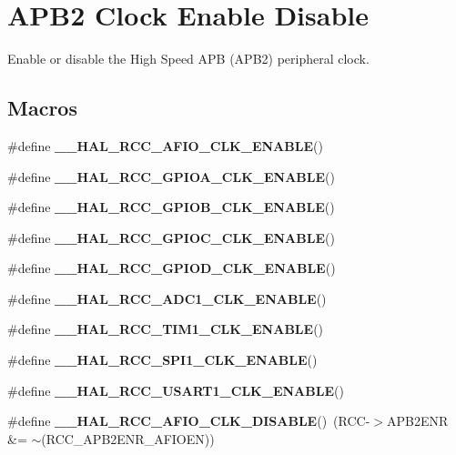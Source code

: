 \hypertarget{group___r_c_c___a_p_b2___clock___enable___disable}{}\section{A\+P\+B2 Clock Enable Disable}
\label{group___r_c_c___a_p_b2___clock___enable___disable}


Enable or disable the High Speed A\+PB (A\+P\+B2) peripheral clock.  


\subsection*{Macros}
\begin{DoxyCompactItemize}
\item 
\#define {\bfseries \+\_\+\+\_\+\+H\+A\+L\+\_\+\+R\+C\+C\+\_\+\+A\+F\+I\+O\+\_\+\+C\+L\+K\+\_\+\+E\+N\+A\+B\+LE}()
\item 
\#define {\bfseries \+\_\+\+\_\+\+H\+A\+L\+\_\+\+R\+C\+C\+\_\+\+G\+P\+I\+O\+A\+\_\+\+C\+L\+K\+\_\+\+E\+N\+A\+B\+LE}()
\item 
\#define {\bfseries \+\_\+\+\_\+\+H\+A\+L\+\_\+\+R\+C\+C\+\_\+\+G\+P\+I\+O\+B\+\_\+\+C\+L\+K\+\_\+\+E\+N\+A\+B\+LE}()
\item 
\#define {\bfseries \+\_\+\+\_\+\+H\+A\+L\+\_\+\+R\+C\+C\+\_\+\+G\+P\+I\+O\+C\+\_\+\+C\+L\+K\+\_\+\+E\+N\+A\+B\+LE}()
\item 
\#define {\bfseries \+\_\+\+\_\+\+H\+A\+L\+\_\+\+R\+C\+C\+\_\+\+G\+P\+I\+O\+D\+\_\+\+C\+L\+K\+\_\+\+E\+N\+A\+B\+LE}()
\item 
\#define {\bfseries \+\_\+\+\_\+\+H\+A\+L\+\_\+\+R\+C\+C\+\_\+\+A\+D\+C1\+\_\+\+C\+L\+K\+\_\+\+E\+N\+A\+B\+LE}()
\item 
\#define {\bfseries \+\_\+\+\_\+\+H\+A\+L\+\_\+\+R\+C\+C\+\_\+\+T\+I\+M1\+\_\+\+C\+L\+K\+\_\+\+E\+N\+A\+B\+LE}()
\item 
\#define {\bfseries \+\_\+\+\_\+\+H\+A\+L\+\_\+\+R\+C\+C\+\_\+\+S\+P\+I1\+\_\+\+C\+L\+K\+\_\+\+E\+N\+A\+B\+LE}()
\item 
\#define {\bfseries \+\_\+\+\_\+\+H\+A\+L\+\_\+\+R\+C\+C\+\_\+\+U\+S\+A\+R\+T1\+\_\+\+C\+L\+K\+\_\+\+E\+N\+A\+B\+LE}()
\item 
\mbox{\label{group___r_c_c___a_p_b2___clock___enable___disable_ga56e350288f38c91c0c4cdb38ffa84f5e}} 
\#define {\bfseries \+\_\+\+\_\+\+H\+A\+L\+\_\+\+R\+C\+C\+\_\+\+A\+F\+I\+O\+\_\+\+C\+L\+K\+\_\+\+D\+I\+S\+A\+B\+LE}()~(R\+CC-\/$>$A\+P\+B2\+E\+NR \&= $\sim$(R\+C\+C\+\_\+\+A\+P\+B2\+E\+N\+R\+\_\+\+A\+F\+I\+O\+EN))

\end{DoxyCompactItemize}
